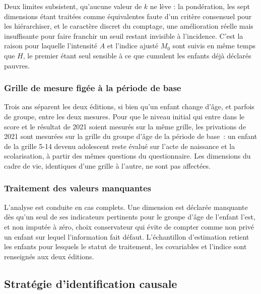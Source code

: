 Deux limites subsistent, qu'aucune valeur de $k$ ne lève : la pondération,
les sept dimensions étant traitées comme équivalentes faute d'un critère
consensuel pour les hiérarchiser, et le caractère discret du comptage, une
amélioration réelle mais insuffisante pour faire franchir un seuil restant
invisible à l'incidence. C'est la raison pour laquelle l'intensité $A$ et
l'indice ajusté $M_0$ sont suivis en même temps que $H$, le premier étant
seul sensible à ce que cumulent les enfants déjà déclarés pauvres.

\subsubsection{Grille de mesure figée à la période de base}

Trois ans séparent les deux éditions, si bien qu'un enfant change d'âge, et
parfois de groupe, entre les deux mesures. Pour que le niveau initial qui
entre dans le score et le résultat de 2021 soient mesurés sur la même
grille, les privations de 2021 sont mesurées sur la grille du groupe d'âge
de la période de base~: un enfant de
la grille 5-14 devenu adolescent reste évalué sur l'acte de naissance et la
scolarisation, à partir des mêmes questions du questionnaire. Les
dimensions du cadre de vie, identiques d'une grille à l'autre, ne sont pas
affectées.

\subsubsection{Traitement des valeurs manquantes}

L'analyse est conduite en cas complets. Une dimension est déclarée
manquante dès qu'un seul de ses indicateurs pertinents pour le groupe d'âge
de l'enfant l'est, et non imputée à zéro, choix conservateur qui évite de
compter comme non privé un enfant sur lequel l'information fait défaut.
L'échantillon d'estimation retient les enfants pour lesquels le statut de
traitement, les covariables et l'indice sont renseignés aux deux éditions.

\subsection{Stratégie d'identification causale}

